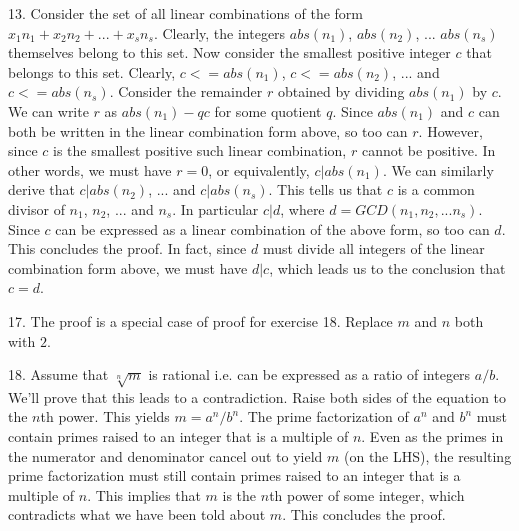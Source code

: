 \documentclass{article}
\begin{document}
13. Consider the set of all linear combinations of the form $x_1n_1 + x_2n_2 + ... + x_sn_s$. Clearly, the integers $abs(n_1)$, $abs(n_2)$, ... $abs(n_s)$ themselves belong to this set. Now consider the smallest positive integer $c$ that belongs to this set. Clearly, $c <= abs(n_1)$, $c <= abs(n_2)$, ... and $c <= abs(n_s)$. Consider the remainder $r$ obtained by dividing $abs(n_1)$ by $c$. We can write $r$ as $abs(n_1) - qc$ for some quotient $q$. Since $abs(n_1)$ and $c$ can both be written in the linear combination form above, so too can $r$. However, since $c$ is the smallest positive such linear combination, $r$ cannot be positive. In other words, we must have $r = 0$, or equivalently, $c | abs(n_1)$. We can similarly derive that $c | abs(n_2)$, ... and $c | abs(n_s)$. This tells us that $c$ is a common divisor of $n_1$, $n_2$, ... and $n_s$. In particular $c | d$, where $d = GCD(n_1, n_2, ...n_s)$. Since $c$ can be expressed as a linear combination of the above form, so too can $d$. This concludes the proof. In fact, since $d$ must divide all integers of the linear combination form above, we must have $d | c$, which leads us to the conclusion that $c = d$.

17. The proof is a special case of proof for exercise 18. Replace $m$ and $n$ both with $2$.

18. Assume that $\sqrt[n]{m}$ is rational i.e. can be expressed as a ratio of integers $a / b$. We'll prove that this leads to a contradiction. Raise both sides of the equation to the $n$th power. This yields $m = a^n / b^n$. The prime factorization of $a^n$ and $b^n$ must contain primes raised to an integer that is a multiple of $n$. Even as the primes in the numerator and denominator cancel out to yield $m$ (on the LHS), the resulting prime factorization must still contain primes raised to an integer that is a multiple of $n$. This implies that $m$ is the $n$th power of some integer, which contradicts what we have been told about $m$. This concludes the proof.
\end{document}
